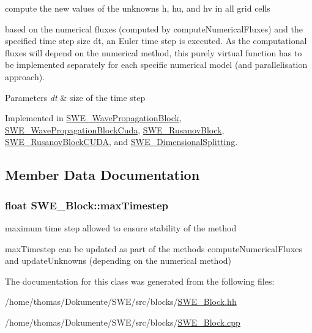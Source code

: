 compute the new values of the unknowns h, hu, and hv in all grid cells 

based on the numerical fluxes (computed by compute\-Numerical\-Fluxes) and the specified time step size dt, an Euler time step is executed. As the computational fluxes will depend on the numerical method, this purely virtual function has to be implemented separately for each specific numerical model (and parallelisation approach). 
\begin{DoxyParams}{Parameters}
{\em dt} & size of the time step \\
\hline
\end{DoxyParams}


Implemented in \hyperlink{classSWE__WavePropagationBlock_a1b1422472a36602b34180e4ed27f6d8c}{S\-W\-E\-\_\-\-Wave\-Propagation\-Block}, \hyperlink{classSWE__WavePropagationBlockCuda_a4163045a47a73515841e754ca3859fc5}{S\-W\-E\-\_\-\-Wave\-Propagation\-Block\-Cuda}, \hyperlink{classSWE__RusanovBlock_a2980aa21030ba8fc607001ad817d7454}{S\-W\-E\-\_\-\-Rusanov\-Block}, \hyperlink{classSWE__RusanovBlockCUDA_a0a18726a733492218423eed37a7ab406}{S\-W\-E\-\_\-\-Rusanov\-Block\-C\-U\-D\-A}, and \hyperlink{classSWE__DimensionalSplitting_af74b527ff9ca7727442db92d2e438531}{S\-W\-E\-\_\-\-Dimensional\-Splitting}.



\subsection{Member Data Documentation}
\hypertarget{classSWE__Block_a05cbc9b40e0483bf73dbc2bdeae7dee3}{
\subsubsection[{max\-Timestep}]{\setlength{\rightskip}{0pt plus 5cm}float S\-W\-E\-\_\-\-Block\-::max\-Timestep\hspace{0.3cm}{\ttfamily [protected]}}}\label{classSWE__Block_a05cbc9b40e0483bf73dbc2bdeae7dee3}


maximum time step allowed to ensure stability of the method 

max\-Timestep can be updated as part of the methods compute\-Numerical\-Fluxes and update\-Unknowns (depending on the numerical method) 

The documentation for this class was generated from the following files\-:\begin{DoxyCompactItemize}
\item 
/home/thomas/\-Dokumente/\-S\-W\-E/src/blocks/\hyperlink{SWE__Block_8hh}{S\-W\-E\-\_\-\-Block.\-hh}\item 
/home/thomas/\-Dokumente/\-S\-W\-E/src/blocks/\hyperlink{SWE__Block_8cpp}{S\-W\-E\-\_\-\-Block.\-cpp}\end{DoxyCompactItemize}
